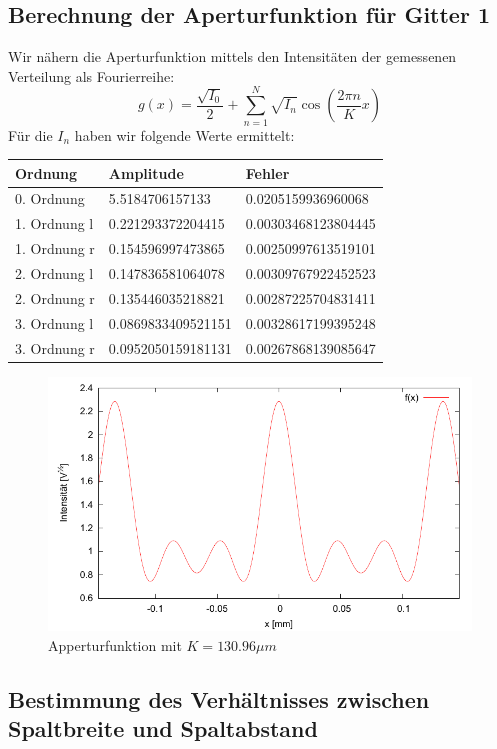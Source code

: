 \subsection{Berechnung der Aperturfunktion f\"ur Gitter 1}

Wir nähern die Aperturfunktion mittels den Intensit\"aten der gemessenen Verteilung als Fourierreihe:
$$g(x) = \frac{\sqrt{I_0}}{2} + \sum_{n=1}^N \sqrt{I_n}\cos\left(\frac{2\pi n}{K}x \right)$$
F\"ur die $I_n$ haben wir folgende Werte ermittelt:

\begin{tabular}{lll}
 \toprule
Ordnung & Amplitude & Fehler \\
\midrule
0. Ordnung & 5.5184706157133 & 0.0205159936960068 \\
1. Ordnung l & 0.221293372204415 & 0.00303468123804445 \\
1. Ordnung r & 0.154596997473865 & 0.00250997613519101 \\
2. Ordnung l & 0.147836581064078 & 0.00309767922452523 \\
2. Ordnung r & 0.135446035218821 & 0.00287225704831411 \\
3. Ordnung l & 0.0869833409521151 & 0.00328617199395248 \\
3. Ordnung r & 0.0952050159181131 & 0.00267868139085647 \\
\bottomrule
\end{tabular}


\begin{figure}[!h]
 \includegraphics{Bilder/appertur.pdf}
\caption{Apperturfunktion mit $K = 130.96 \mu m $}
\end{figure}


\subsection{Bestimmung des Verh\"altnisses zwischen Spaltbreite und Spaltabstand}

